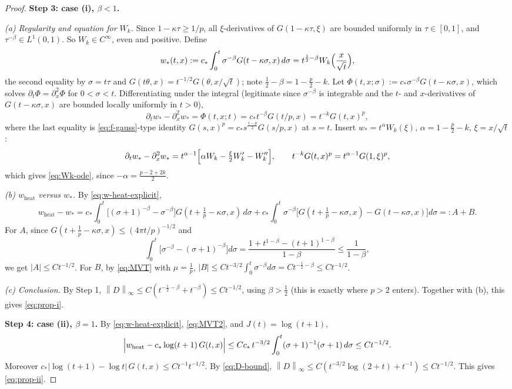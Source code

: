 \documentclass[11pt]{amsart}
\theoremstyle{definition}
\theoremstyle{remark}
\numberwithin{equation}{section}
\newcommand{\pt}{\partial}
\newcommand{\norm}[1]{\left\lVert #1\right\rVert}
\begin{document}
\begin{proof}
\medskip
\noindent\textbf{Step 3: case (i), $\beta<1$.}

\emph{(a) Regularity and equation for $W_k$.}
Since $1-\kappa\tau\ge1/p$, all $\xi$-derivatives of $G(1-\kappa\tau,\xi)$ are bounded uniformly in $\tau\in[0,1]$, and
$\tau^{-\beta}\in L^1(0,1)$. So $W_k\in C^\infty$, even and positive. Define
\[
w_*(t,x):=c_*\int_0^t\sigma^{-\beta}G(t-\kappa\sigma,x)\,d\sigma=t^{\frac12-\beta}W_k\Bigl(\frac x{\sqrt t}\Bigr),
\]
the second equality by $\sigma=t\tau$ and $G(t\theta,x)=t^{-1/2}G(\theta,x/\sqrt t)$; note $\frac12-\beta=1-\frac p2-k$.
Let $\Phi(t,x;\sigma):=c_*\sigma^{-\beta}G(t-\kappa\sigma,x)$, which solves $\pt_t\Phi=\pt_x^2\Phi$ for $0<\sigma<t$.
Differentiating under the integral (legitimate since $\sigma^{-\beta}$ is integrable and the $t$- and $x$-derivatives of $G(t-\kappa\sigma,x)$ are bounded locally uniformly in $t>0$),
\[
\pt_tw_*-\pt_x^2w_*=\Phi(t,x;t)=c_*t^{-\beta}G(t/p,x)=t^{-k}G(t,x)^p,
\]
where the last equality is \eqref{eq:f-gauss}-type identity $G(s,x)^p=c_*s^{\frac{1-p}2}G(s/p,x)$ at $s=t$.
Insert $w_*=t^{\alpha}W_k(\xi)$, $\alpha=1-\frac p2-k$, $\xi=x/\sqrt t$:
\[
\pt_tw_*-\pt_x^2w_*=t^{\alpha-1}\Bigl[\alpha W_k-\tfrac\xi2W_k'-W_k''\Bigr],\qquad t^{-k}G(t,x)^p=t^{\alpha-1}G(1,\xi)^p,
\]
which gives \eqref{eq:Wk-ode}, since $-\alpha=\frac{p-2+2k}{2}$.

\emph{(b) $w_{\mathrm{heat}}$ versus $w_*$.} By \eqref{eq:w-heat-explicit},
\[
w_{\mathrm{heat}}-w_*=c_*\int_0^t\bigl[(\sigma+1)^{-\beta}-\sigma^{-\beta}\bigr]G(t+\tfrac1p-\kappa\sigma,x)\,d\sigma
+c_*\int_0^t\sigma^{-\beta}\bigl[G(t+\tfrac1p-\kappa\sigma,x)-G(t-\kappa\sigma,x)\bigr]d\sigma=:A+B.
\]
For $A$, since $G(t+\frac1p-\kappa\sigma,x)\le(4\pi t/p)^{-1/2}$ and
\[
\int_0^t\bigl[\sigma^{-\beta}-(\sigma+1)^{-\beta}\bigr]d\sigma
=\frac{1+t^{1-\beta}-(t+1)^{1-\beta}}{1-\beta}\le\frac1{1-\beta},
\]
we get $|A|\le Ct^{-1/2}$. For $B$, by \eqref{eq:MVT} with $\mu=\frac1p$,
$|B|\le Ct^{-3/2}\int_0^t\sigma^{-\beta}d\sigma=Ct^{-\frac12-\beta}\le Ct^{-1/2}$.

\emph{(c) Conclusion.} By Step 1, $\norm{D}_\infty\le C(t^{-\frac12-\beta}+t^{-\beta})\le Ct^{-1/2}$, using $\beta>\frac12$
(this is exactly where $p>2$ enters). Together with (b), this gives \eqref{eq:prop-i}.

\medskip
\noindent\textbf{Step 4: case (ii), $\beta=1$.}
By \eqref{eq:w-heat-explicit}, \eqref{eq:MVT2}, and $J(t)=\log(t+1)$,
\[
\Bigl|w_{\mathrm{heat}}-c_*\log(t+1)\,G(t,x)\Bigr|
\le Cc_*\,t^{-3/2}\int_0^t(\sigma+1)^{-1}(\sigma+1)\,d\sigma\le Ct^{-1/2}.
\]
Moreover $c_*|\log(t+1)-\log t|\,G(t,x)\le Ct^{-1}t^{-1/2}$. By \eqref{eq:D-bound},
$\norm{D}_\infty\le C(t^{-3/2}\log(2+t)+t^{-1})\le Ct^{-1/2}$. This gives \eqref{eq:prop-ii}.


\end{proof}
\end{document}
